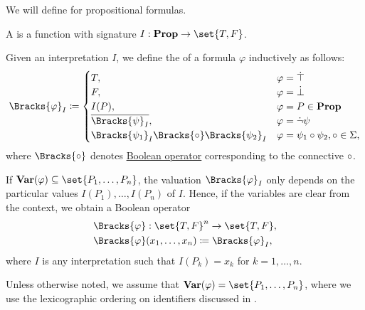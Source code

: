 \begin{definition}\label{def:propositional_valuation}
  We will define  for propositional formulas.

  \begin{thmenum}
     A  is a function with signature \( I: \boldop{Prop} \to \set{ T, F } \).

    \medskip

     Given an interpretation \( I \), we define the  of a formula \( \varphi \) inductively as follows:
    \begin{equation}\label{eq:def:propositional_valuation/formula_interpretation}
      \Bracks{\varphi}_I \coloneqq \begin{cases}
        T,                                                    &\varphi = \syntop \\
        F,                                                    &\varphi = \synbot \\
        I(P),                                                 &\varphi = P \in \boldop{Prop} \\
        \overline{\Bracks{\psi}_I},                           &\varphi = \synneg \psi \\
        \Bracks{\psi_1}_I \Bracks{\bincirc} \Bracks{\psi_2}_I &\varphi = \psi_1 \bincirc \psi_2, \bincirc \in \Sigma,
      \end{cases}
    \end{equation}
    where \( \Bracks{\bincirc} \) denotes \hyperref[def:standard_boolean_operators]{Boolean operator} corresponding to the connective \( \bincirc \).

     If \( \boldop{Var}(\varphi) \subseteq \set{ P_1, \ldots, P_n } \), the valuation \( \Bracks{\varphi}_I \) only depends on the particular values \( I(P_1), \ldots, I(P_n) \) of \( I \). Hence, if the variables are clear from the context, we obtain a Boolean operator
    \begin{equation*}
      \begin{aligned}
        &\Bracks{\varphi}: \set{ T, F }^n \to \set{ T, F }, \\
        &\Bracks{\varphi}(x_1, \ldots, x_n) \coloneqq \Bracks{\varphi}_I,
      \end{aligned}
    \end{equation*}
    where \( I \) is any interpretation such that \( I(P_k) = x_k \) for \( k = 1, \ldots, n \).

    Unless otherwise noted, we assume that \( \boldop{Var}(\varphi) = \set{ P_1, \ldots, P_n } \), where we use the lexicographic ordering on identifiers discussed in .
  \end{thmenum}
\end{definition}
